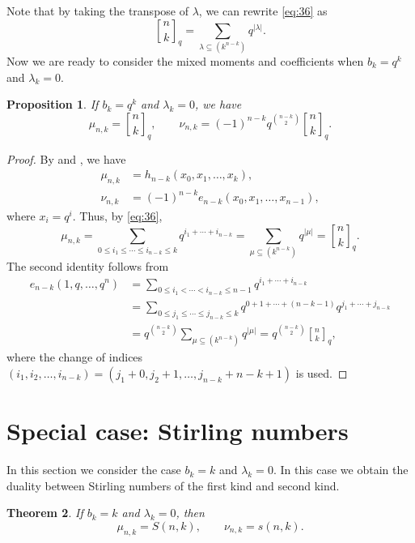 \documentclass[oneside]{book}
\numberwithin{equation}{section}
\newtheorem{thm}{Theorem}[section]
\newtheorem{prop}[thm]{Proposition}
\theoremstyle{definition}
\newcommand\Qbinom[3]{\genfrac{[}{]}{0pt}{}{#1}{#2}_{#3}}
\newcommand\qbinom[2]{\Qbinom{#1}{#2}{q}}
\begin{document}
Note that by taking the transpose of \( \lambda \),
we can rewrite \eqref{eq:36} as
\begin{equation}\label{eq:37}
  \qbinom{n}{k} = \sum_{\lambda\subseteq(k^{n-k})} q^{|\lambda|}.
\end{equation}
Now we are ready to consider the mixed moments and coefficients when
\( b_k=q^k \) and \( \lambda_k=0 \).

\begin{prop}
  If \( b_k=q^k \) and \( \lambda_k=0 \), we have
\[
  \mu_{n,k} = \qbinom{n}{k}, \qquad 
  \nu_{n,k} = (-1)^{n-k} q^{\binom{n-k}{2}}\qbinom{n}{k}.
\]
\end{prop}

\begin{proof}
  By  and , we have
  \begin{align*}
    \mu_{n,k} &= h_{n-k}(x_0,x_1,\dots,x_{k}),\\
    \nu_{n,k} &= (-1)^{n-k} e_{n-k}(x_0,x_1,\dots,x_{n-1}),
  \end{align*}
where \( x_i = q^i \).
Thus, by \eqref{eq:36},
\[
  \mu_{n,k} = \sum_{0\le i_1 \le \cdots \le i_{n-k}\le k} q^{i_1 +
    \cdots + i_{n-k}} =\sum_{\mu\subseteq(k^{n-k})} q^{|\mu|}
  = \qbinom{n}{k}.
  \]
 The second identity follows from 
 \begin{align*}
   e_{n-k}(1,q,\dots,q^n)
   &= \sum_{0\le i_1 < \cdots < i_{n-k}\le n-1} q^{i_1 +
     \cdots + i_{n-k}}\\
   &= \sum_{0\le j_1 \le \cdots \le j_{n-k}\le k} q^{0+1 + \cdots + (n-k-1)}q^{j_1 +
     \cdots + j_{n-k}}\\
   &= q^{\binom{n-k}{2}}\sum_{\mu\subseteq(k^{n-k})} q^{|\mu|}
     = q^{\binom{n-k}{2}}\qbinom{n}{k},
 \end{align*} 
 where the change of indices
 \( (i_1,i_2,\dots,i_{n-k}) = (j_1+0,j_2+1,\dots,j_{n-k}+n-k+1) \)
 is used.
\end{proof}


\section{Special case: Stirling numbers}

In this section we consider the case \( b_k = k \) and
\( \lambda_k=0 \). In this case we obtain the duality between Stirling
numbers of the first kind and second kind.


\begin{thm}\label{thm:6}
  If \( b_k = k \) and \( \lambda_k=0 \), then
  \[
    \mu_{n,k} = S(n,k), \qquad \nu_{n,k} = s(n,k).
  \]
\end{thm}
\end{document}
